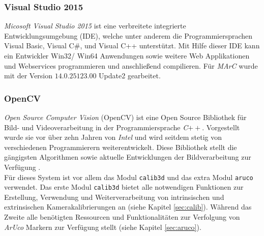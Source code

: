 \subsubsection{Visual Studio 2015}\label{sec:VisualStudio} 

\textit{Micosoft Visual Studio 2015} ist eine verbreitete integrierte Entwicklungsumgebung (IDE), welche unter anderem die Programmiersprachen Visual Basic, Visual C$\#$, und Visual C++ unterstützt. Mit Hilfe dieser IDE kann ein Entwickler Win32/ Win64 Anwendungen sowie weitere Web Applikationen und Webservices \cite{website:VisuStud} programmieren und anschließend compilieren. Für \textit{MArC} wurde mit der Version $14.0.25123.00$ Update2 gearbeitet.

\subsubsection{OpenCV} \label{sec:OpenCV} 
\textit{Open Source Computer Vision} (OpenCV) ist eine Open Source Bibliothek für Bild- und Videoverarbeitung in der Programmiersprache \textit{C}$++$. Vorgestellt wurde sie vor über zehn Jahren von \textit{Intel} und wird seitdem stetig von verschiedenen Programmierern weiterentwickelt. Diese Bibliothek stellt die gängigsten Algorithmen sowie aktuelle Entwicklungen der Bildverarbeitung zur Verfügung
\cite{article:OpenCV}.\\
Für dieses System ist vor allem das Modul \texttt{calib3d} \cite{website:Calib3dDoc} und das extra Modul \texttt{aruco} \cite{website:ArucoDoc} verwendet. Das erste Modul \texttt{calib3d}  bietet alle notwendigen Funktionen zur Erstellung, Verwendung und Weiterverarbeitung von intrinsischen und extrinsischen Kamerakalibrierungen an (siehe Kapitel \ref{sec:calib}). Während das Zweite alle benötigten Ressourcen und Funktionalitäten zur Verfolgung von \textit{ArUco} Markern zur Verfügung stellt (siehe Kapitel \ref{sec:aruco}).

